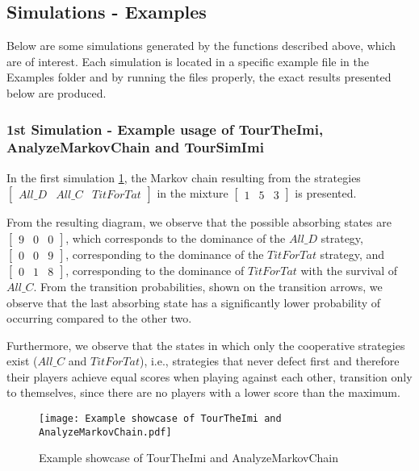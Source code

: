 \subsection{Simulations - Examples}
Below are some simulations generated by the functions described above, which are of interest. Each simulation is located in a specific example file in the Examples folder and by running the files properly, the exact results presented below are produced.
\subsubsection{1st Simulation - Example usage of Tour\-The\-Imi, Analyze\-Markov\-Chain and Tour\-Sim\-Imi}
In the first simulation \ref{fig:TourTheImi153}, the Markov chain resulting from the strategies $\begin{bmatrix}All\_D & All\_C & TitForTat\end{bmatrix}$ in the mixture $\begin{bmatrix}1 & 5 & 3\end{bmatrix}$ is presented.

From the resulting diagram, we observe that the possible absorbing states are $\begin{bmatrix}9 & 0 & 0\end{bmatrix}$, which corresponds to the dominance of the $All\_D$ strategy, $\begin{bmatrix}0 & 0 & 9\end{bmatrix}$, corresponding to the dominance of the $TitForTat$ strategy, and $\begin{bmatrix}0 & 1 & 8\end{bmatrix}$, corresponding to the dominance of $TitForTat$ with the survival of $All\_C$. From the transition probabilities, shown on the transition arrows, we observe that the last absorbing state has a significantly lower probability of occurring compared to the other two.

Furthermore, we observe that the states in which only the cooperative strategies exist ($All\_C$ and $TitForTat$), i.e., strategies that never defect first and therefore their players achieve equal scores when playing against each other, transition only to themselves, since there are no players with a lower score than the maximum.


	\begin{figure}[h]
	      \centering
	      \texttt{[image: Example showcase of TourTheImi and AnalyzeMarkovChain.pdf]}
	      \caption{Example showcase of TourTheImi and AnalyzeMarkovChain}
	      \label{fig:TourTheImi153}
	\end{figure}
	

